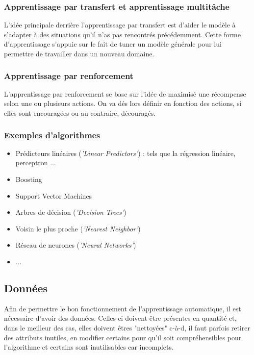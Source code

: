 \documentclass[a4paper]{article}
\begin{document}
\subsubsection{Apprentissage par transfert et apprentissage multitâche}
L'idée principale derrière l'apprentissage par transfert est d'aider le modèle à s'adapter à des situations qu'il n'as pas rencontrés précédemment. Cette forme d'apprentissage s'appuie sur le fait de tuner un modèle générale pour lui permettre de travailler dans un nouveau domaine.

\newpage

\subsubsection{Apprentissage par renforcement}
L'apprentissage par renforcement se base sur l'idée de maximisé une récompense selon une ou plusieurs actions. On va dés lors définir en fonction des actions, si elles sont encouragées ou au contraire, découragés.

\subsubsection{Exemples d'algorithmes}

\begin{itemize}
	\item Prédicteurs linéaires (\textit{'Linear Predictors'}) : tels que la régression linéaire, perceptron ...
	\item Boosting
	\item Support Vector Machines
	\item Arbres de décision (\textit{'Decision Trees'})
	\item Voisin le plus proche (\textit{'Nearest Neighbor'})
	\item Réseau de neurones (\textit{'Neural Networks'})
	\item ...
\end{itemize}

\newpage

\subsection{Données}
\label{Data}
Afin de permettre le bon fonctionnement de l'apprentissage automatique, il est nécessaire d'avoir des données. Celles-ci doivent être présentes en quantité et, dans le meilleur des cas, elles doivent êtres "nettoyées" c-à-d, il faut parfois retirer des attributs inutiles, en modifier certains pour qu'il soit compréhensibles pour l'algorithme et certains sont inutilisables car incomplets. \newline
\end{document}
